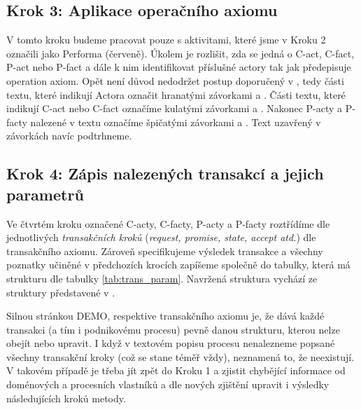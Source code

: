 \documentclass[]{article}
\begin{document}
\subsection{Krok 3: Aplikace operačního axiomu}
V tomto kroku budeme pracovat pouze s aktivitami, které jsme v Kroku 2 označili jako Performa (červeně). Úkolem je rozlišit, zda se jedná o C-act, C-fact, P-act nebo P-fact a dále k nim identifikovat příslušné actory tak jak předepisuje operation axiom. Opět není důvod nedodržet postup doporučený v \cite{Dietz2006}, tedy části textu, které indikují Actora označit hranatými závorkami \uv{[} a \uv{]}. Části textu, které indikují C-act nebo C-fact označíme kulatými závorkami \uv{(} a \uv{)}. Nakonec P-acty a P-facty nalezené v textu označíme špičatými závorkami \uv{$<$}  a \uv{$>$}. Text uzavřený v závorkách navíc podtrhneme.

\subsection{Krok 4: Zápis nalezených transakcí a jejich parametrů}
Ve čtvrtém kroku označené C-acty, C-facty, P-acty a P-facty roztřídíme dle jednotlivých \textit{transakčních kroků} (\textit{request, promise, state, accept atd.}) dle transakčního axiomu. Zároveň specifikujeme výsledek transakce a všechny poznatky učiněné v předchozích krocích zapíšeme společně do tabulky, která má strukturu dle tabulky \ref{tab:trans_param}. Navržená struktura vychází ze struktury představené v \cite{Naplava2015}.

Silnou stránkou DEMO, respektive transakčního axiomu je, že dává každé transakci (a tím i podnikovému procesu) pevně danou strukturu, kterou nelze obejít nebo upravit. I když v textovém popisu procesu nenalezneme popsané všechny transakční kroky (což se stane téměř vždy), neznamená to, že neexistují. V takovém případě je třeba jít zpět do Kroku 1 a zjistit chybějící informace od doménových a procesních vlastníků a dle nových zjištění upravit i výsledky následujících kroků metody.
\end{document}
